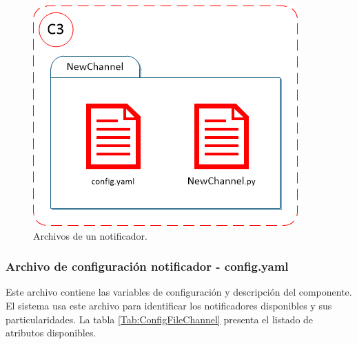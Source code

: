         \begin{figure}[ht!]
        	\centering
        	\includegraphics[width=0.6\linewidth]{imgs/03-Architecture/03-TplChannelFiles.png}
        	\caption[Archivos de un notificador]{Archivos de un notificador.}
    	    \label{fig:TplChannelFiles}
        \end{figure}%
        
        \subsubsection{Archivo de configuración notificador - config.yaml}
        \label{sub2:ConfigFileChannel}
            Este archivo contiene las variables de configuración y descripción del componente. El sistema usa este archivo para identificar los notificadores disponibles y sus particularidades. La tabla \ref{Tab:ConfigFileChannel} presenta el listado de atributos disponibles.

